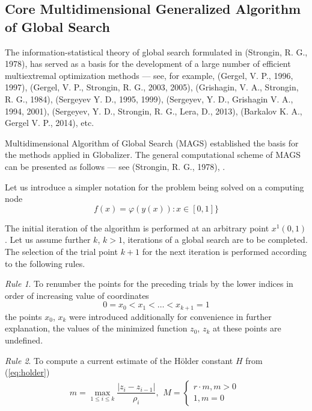 \documentclass{gOMS2e}
\theoremstyle{plain}%
\theoremstyle{definition}
\theoremstyle{remark}
\begin{document}
\subsection{Core Multidimensional Generalized Algorithm of Global Search}
\label{subsec:corepar}
The information-statistical theory of global search formulated in (Strongin, R. G., 1978), \cite{strSergGO}
has served as a basis for the development of a large number of efficient multiextremal
optimization methods --- see, for example, (Gergel, V. P., 1996, 1997), (Gergel, V. P., Strongin, R. G., 2003, 2005), (Grishagin, V. A., Strongin, R. G., 1984), (Sergeyev Y. D., 1995, 1999), (Sergeyev, Y. D., Grishagin V. A., 1994, 2001), (Sergeyev, Y. D., Strongin, R. G., Lera, D., 2013), (Barkalov K. A., Gergel V. P., 2014), etc.
\par
Multidimensional Algorithm of Global Search (MAGS) established the basis for the
methods applied in Globalizer. The general computational scheme of MAGS can be
presented as follows --- see (Strongin, R. G., 1978), \cite{strSergGO}.
\par
Let us introduce a simpler notation for the problem being solved on a computing node
\begin{equation}
\label{eq:oneDimFunc}
f(x) = \varphi(y(x)):x\in [0,1]\}
\end{equation}
\par
The initial iteration of the algorithm is performed at an arbitrary point \(x^1(0,1)\).
Let us assume further \(k\), \(k>1\), iterations of a global search are to be completed.
The selection of the trial point \(k+1\) for the next iteration is performed according to the following rules.
\par
\textit{Rule 1}. To renumber the points for the preceding trials by the lower indices in order of increasing value of coordinates
\begin{equation}
  \label{step1}
0=x_0<x_1<\dotsc<x_{k+1}=1
\end{equation}
the points \(x_0\), \(x_k\) were introduced additionally for convenience in further explanation,
the values of the minimized function \(z_0\), \(z_k\) at these points are undefined.
\par
\textit{Rule 2}. To compute a current estimate of the Hölder constant \(H\) from (\ref{eq:holder})
\begin{equation}
  \label{step2}
m=\max_{1\leqslant i\leqslant k}\dfrac{|z_i-z_{i-1}|}{\rho_i},
\begin{matrix}
    M =
    \left\{
    \begin{matrix}
    r\cdot m,m>0 \\
    1,m=0
    \end{matrix} \right.
    \end{matrix}
\end{equation}
\end{document}
